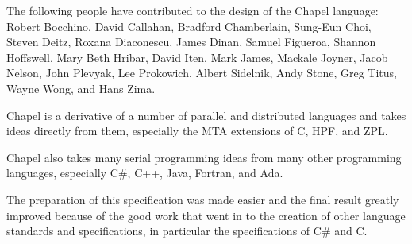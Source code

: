 \label{Acknowledgments}

The following people have contributed to the design of the Chapel
language:
Robert Bocchino,
David Callahan,
Bradford Chamberlain,
Sung-Eun Choi,
Steven Deitz,
Roxana Diaconescu,
James Dinan,
Samuel Figueroa,
Shannon Hoffswell,
Mary Beth Hribar,
David Iten,
Mark James,
Mackale Joyner,
Jacob Nelson,
John Plevyak,
Lee Prokowich,
Albert Sidelnik,
Andy Stone,
Greg Titus,
Wayne Wong,
and Hans Zima.

Chapel is a derivative of a number of parallel and distributed
languages and takes ideas directly from them, especially the MTA
extensions of C, HPF, and ZPL.

Chapel also takes many serial programming ideas from many other
programming languages, especially C\#, C++, Java, Fortran, and Ada.

The preparation of this specification was made easier and the final
result greatly improved because of the good work that went in to the
creation of other language standards and specifications, in particular
the specifications of C\# and C.
